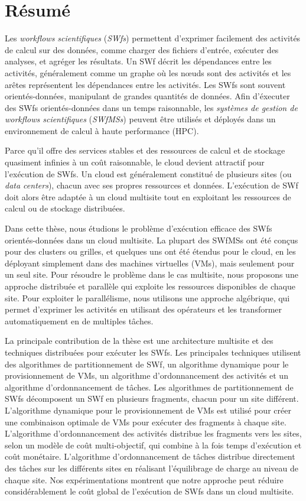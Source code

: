 \chapter{Résumé}

Les \textit{workflows scientifiques} (\textit{SWfs}) permettent d'exprimer facilement des activités de calcul sur des données, comme charger des fichiers d'entrée, exécuter des analyses, et agréger les résultats. Un SWf décrit les dépendances entre les activités, généralement comme un graphe où les nœuds sont des activités et les arêtes représentent les dépendances entre les activités. Les SWfs sont souvent orientés-données, manipulant de grandes quantités de données. Afin d'éxecuter des SWfs orientés-données dans un temps raisonnable, les \textit{systèmes de gestion de workflows scientifiques} (\textit{SWfMSs}) peuvent être utilisés et déployés dans un environnement de calcul à haute performance (HPC).

Parce qu'il offre des services stables et des ressources de calcul et de stockage quasiment infinies à un coût raisonnable, le cloud devient attractif pour l'exécution de SWfs. Un cloud est généralement constitué de plusieurs sites (ou \textit{data centers}), chacun avec ses propres ressources et données. 
L'exécution de SWf doit alors être adaptée à un cloud multisite tout en exploitant les ressources de calcul ou de stockage distribuées.

Dans cette thèse, nous étudions le problème d'exécution efficace des SWfs orientés-données dans un cloud multisite. La plupart des SWfMSs ont été conçus pour des clusters ou grilles, et quelques uns ont été étendus pour le cloud, en les déployant simplement dans des machines virtuelles (VMs), mais seulement pour un seul site. Pour résoudre le problème dans le cas multisite, nous proposons une approche distribuée et parallèle qui exploite les ressources disponibles de chaque site. Pour exploiter le parallélisme, nous utilisons une approche algébrique, qui permet d'exprimer les activités en utilisant des opérateurs et les transformer automatiquement en de multiples tâches.

La principale contribution de la thèse est une architecture multisite et des techniques distribuées pour exécuter les SWfs. Les principales techniques utilisent des algorithmes de partitionnement de SWf, un algorithme dynamique pour le provisionnement de VMs, un algorithme d'ordonnancement des activités et un algorithme d'ordonnancement de tâches. 
Les algorithmes de partitionnement de SWfs décomposent un SWf en plusieurs fragments, chacun pour un site différent. L'algorithme dynamique pour le provisionnement de VMs est utilisé pour créer une combinaison optimale de VMs pour exécuter des fragments à chaque site. L'algorithme d'ordonnancement des activités distribue les fragments vers les sites, selon un modèle de coût multi-objectif, qui combine à la fois temps d'exécution et coût monétaire. L'algorithme d'ordonnancement de tâches distribue directement des tâches sur les différents sites en réalisant l'équilibrage de charge au niveau de chaque site. Nos expérimentations montrent que notre approche peut réduire considérablement le coût global de l'exécution de SWfs dans un cloud multisite.

